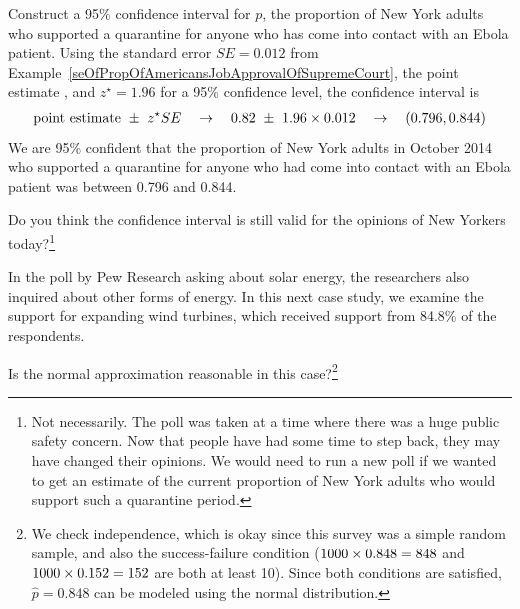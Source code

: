 \begin{example}{Construct a 95\% confidence interval for $p$,
    the proportion of New York adults who supported a quarantine
    for anyone who has come into contact with an Ebola patient.}
  Using the standard error $SE = 0.012$ from
  Example~\ref{seOfPropOfAmericansJobApprovalOfSupremeCourt},
  the point estimate \wsjebolapollprop{}, and $z^{\star} = 1.96$
  for a 95\% confidence level, the confidence interval is
  \begin{eqnarray*}
  \text{point estimate} \ \pm\ z^{\star}SE
    \quad\to\quad 0.82{} \ \pm\ 1.96\times 0.012{}
    \quad\to\quad (0.796, 0.844)
  \end{eqnarray*}
  We are 95\% confident that the proportion of New York adults
  in October 2014 who supported a quarantine for anyone who had come
  into contact with an Ebola patient was between 0.796 and 0.844.
\end{example}

\begin{exercise}
Do you think the confidence interval is still valid for the opinions
of New Yorkers today?\footnote{Not necessarily. The poll was taken at a
time where there was a huge public safety concern. Now that people
have had some time to step back, they may have changed their opinions.
We would need to run a new poll if we wanted to get an estimate of the
current proportion of New York adults who would support such a
quarantine period.}
\end{exercise}


\newcommand{\pewwindpollsize}{\pewsolarpollsize}
\newcommand{\pewwindpollprop}{0.848}
\newcommand{\pewwindpollpropcomplement}{0.152}
\newcommand{\pewwindpollpercent}{84.8}
\newcommand{\pewwindpollpercentcomplement}{15.2}
\newcommand{\pewwindpollcount}{848}
\newcommand{\pewwindpollcountcomplement}{152}
\newcommand{\pewwindpollse}{0.0114}

In the poll by Pew Research asking about solar energy, the
researchers also inquired about other forms of energy.
In this next case study, we examine the support for expanding wind
turbines, which received support from \pewwindpollpercent{}\%
of the \pewwindpollsize{} respondents.

\begin{exercise}\label{pew_wind_turbine_support_normal_dist_gp}
Is the normal approximation reasonable in this case?\footnote{We
check independence, which is okay since this survey was a simple
random sample, and also the success-failure condition
($\pewwindpollsize{} \times \pewwindpollprop{} = \pewwindpollcount{}$
and $\pewwindpollsize{} \times \pewwindpollpropcomplement{}
    = \pewwindpollcountcomplement$ are both at least 10).
Since both conditions are satisfied,
$\hat{p} = \pewwindpollprop{}$ can be
modeled using the normal distribution.}
\end{exercise}

